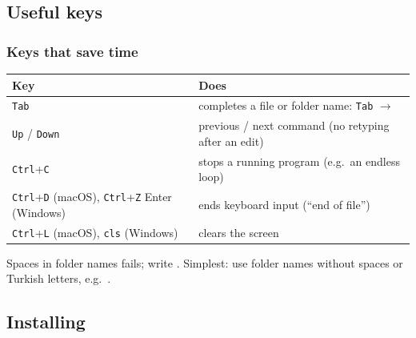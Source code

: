 \documentclass[aspectratio=169,10pt,compress]{beamer}
\begin{document}
\subsection[Keys]{Useful keys}




\begin{frame}[t,fragile] \frametitle{Keys that save time}
  \small
  \begin{tabular}{@{}L{0.25\textwidth}L{0.65\textwidth}@{}}
    \toprule
    \textbf{Key}                      & \textbf{Does} \\
    \midrule
    \texttt{Tab}                      & completes a file or folder name: \texttt{Tab} $\to$  \\
    \texttt{Up} / \texttt{Down}       & previous / next command (no retyping after an edit) \\
    \texttt{Ctrl}+\texttt{C}          & stops a running program (e.g.\ an endless loop) \\
    \texttt{Ctrl}+\texttt{D} (macOS), \texttt{Ctrl}+\texttt{Z} Enter (Windows) & ends keyboard input (``end of file'') \\
    \texttt{Ctrl}+\texttt{L} (macOS), \texttt{cls} (Windows) & clears the screen \\
    \bottomrule
  \end{tabular}

  \vspace{0.6em}
  \begin{alertblock}{Spaces in folder names}
    \small {} fails; write . Simplest: use folder names without spaces or Turkish letters,
    e.g.\ .
  \end{alertblock}
\end{frame}


\subsection[Install]{Installing}
\end{document}
